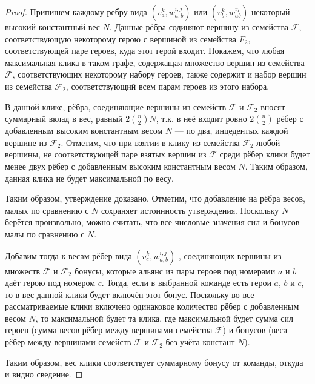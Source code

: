 \documentclass{article}
\begin{document}
\begin{proof}
    Припишем каждому ребру вида $(v_a^k, w_{a,b}^{i,j})$ или $(v_b^k, w_{ab}^{i j})$ некоторый высокий константный вес $N$. Данные рёбра содиняют вершину из семейства $\mathcal{F}$, соответствующую некоторому герою с вершиной из семейства $F_2$, соответствующей паре героев, куда этот герой входит. Покажем, что любая максимальная клика в таком графе, содержащая множество вершин из семейства $\mathcal{F}$, соответствующих некоторому набору героев, также содержит и набор вершин из семейства $\mathcal{F}_2$, соответствующий всем парам героев из этого набора.
    
    В данной клике, рёбра, соединяющие вершины из семейств $\mathcal{F}$ и $\mathcal{F}_2$ вносят суммарный вклад в вес, равный $2 \binom{n}{2} N$, т.к. в неё входит ровно $2 \binom{n}{2}$ рёбер с добавленным высоким константным весом $N$ --- по два, инцедентых каждой вершине из $\mathcal{F}_2$. Отметим, что при взятии в клику из семейства $\mathcal{F}_2$ любой вершины, не соответствующей паре взятых вершин из $\mathcal{F}$ среди рёбер клики будет менее двух рёбер с добавленным высоким константным весом $N$. Таким образом, данная клика не будет максимальной по весу.
    
Таким образом, утверждение доказано. Отметим, что добавление на рёбра весов, малых по сравнению с $N$ сохраняет истоинность утверждения. Поскольку $N$ берётся произвольно, можно считать, что все числовые значения сил и бонусов малы по сравнению с $N$.

Добавим тогда к весам рёбер вида  $(v_c^{k}, w_{a,b}^{i,j} )$ , соединяющих вершины из множеств 
$\mathcal{F}$ и $\mathcal{F}_2$ бонусы, которые альянс из пары героев под номерами $a$ и $b$ даёт герою под номером $c$. Тогда, если в выбранной команде есть герои $a$, $b$ и $c$, то в вес данной клики будет включён этот бонус. Поскольку во все рассматриваемые клики включено одинаковое количество рёбер с добавленным весом $N$, то максимальной будет та клика, где максимальной будет сумма сил героев (сумма весов рёбер между вершинами семейства $\mathcal{F}$) и бонусов (веса рёбер между вершинами семейств $\mathcal{F}$ и $\mathcal{F}_2$ без учёта констант $N$).
    
Таким образом, вес клики соответствует суммарному бонусу от команды, откуда и видно сведение.
    
\end{proof}

\end{document}
